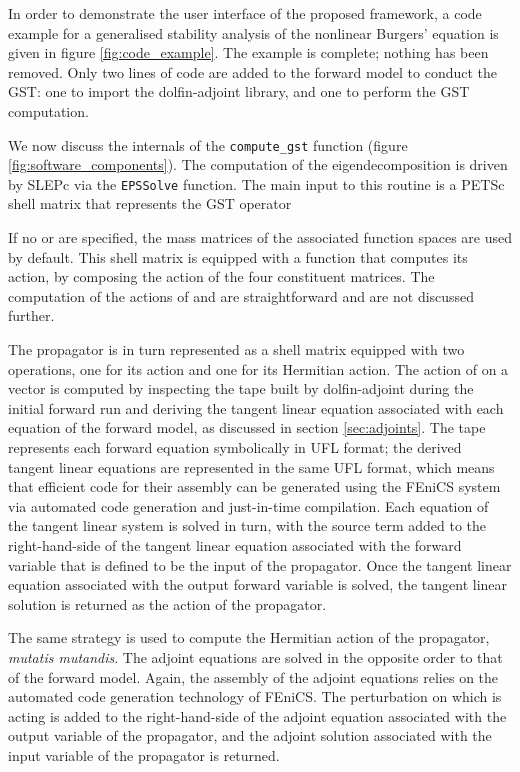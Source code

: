 \documentclass{siamltex}
\begin{document}
In order to demonstrate the user interface of the proposed framework, a code example for a generalised stability analysis of the nonlinear Burgers'
equation is given in figure \ref{fig:code_example}. The example is complete; nothing has been removed. Only two lines
of code are added to the forward model to conduct the GST: one to import the dolfin-adjoint library, and one to perform
the GST computation. 

We now discuss the internals of the \texttt{compute\_gst} function (figure \ref{fig:software_components}). The computation of the eigendecomposition
is driven by SLEPc via the \texttt{EPSSolve} function. The main input to this routine is a PETSc shell matrix that represents
the GST operator

If no  or  are specified, the mass matrices of the associated function spaces are used by default. This shell matrix
is equipped with a function that computes its action, by composing the action of the four constituent matrices.
The computation of the actions of  and  are straightforward and are not discussed further.

The propagator  is in turn represented as a shell matrix equipped with two operations, one for its
action and one for its Hermitian action.  The action of  on a vector  is computed by inspecting
the tape built by dolfin-adjoint during the initial forward run and deriving the tangent linear equation associated with each equation of the
forward model, as discussed in section \ref{sec:adjoints}. The tape represents each forward equation symbolically in UFL format; the derived tangent
linear equations are represented in the same UFL format, which means that efficient code for their assembly
can be generated using the FEniCS system via automated code generation and just-in-time compilation. Each equation of the tangent linear system is
solved in turn, with the source term  added to the right-hand-side of the tangent linear equation
associated with the forward variable that is defined to be the input of the propagator. Once the tangent
linear equation associated with the output forward variable is solved, the tangent linear solution is returned
as the action of the propagator.

The same strategy is used to compute the Hermitian action of the propagator, \emph{mutatis mutandis}.
The adjoint equations are solved in the opposite order to that of the forward model. Again, the assembly of the
adjoint equations relies on the automated code generation technology of FEniCS. The perturbation on
which  is acting is added to the right-hand-side of the adjoint equation associated with the output variable of the propagator, and the adjoint solution
associated with the input variable of the propagator is returned.
\end{document}
